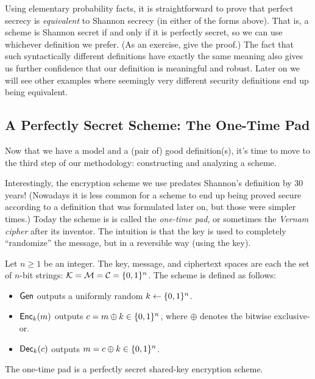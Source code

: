 \documentclass[11pt]{article}
\begin{document}
Using elementary probability facts, it is straightforward to prove
that perfect secrecy is \emph{equivalent} to Shannon secrecy (in
either of the forms above).  That is, a scheme is Shannon secret if
and only if it is perfectly secret, so we can use whichever definition
we prefer.  (As an exercise, give the proof.)  The fact that such
syntactically different definitions have exactly the same meaning also
gives us further confidence that our definition is meaningful and
robust.  Later on we will see other examples where seemingly very
different security definitions end up being equivalent.

\subsection{A Perfectly Secret Scheme: The One-Time Pad}
\label{sec:one-time-pad}

Now that we have a model and a (pair of) good definition(s), it's time
to move to the third step of our methodology: constructing and
analyzing a scheme.

Interestingly, the encryption scheme we use predates Shannon's
definition by 30 years!  (Nowadays it is less common for a scheme to
end up being proved secure according to a definition that was
formulated later on, but those were simpler times.)  Today the scheme
is is called the \emph{one-time pad}, or sometimes the \emph{Vernam
  cipher} after its inventor.  The intuition is that the key is used
to completely ``randomize'' the message, but in a reversible way
(using the key).

\begin{definition}
  Let $n \geq 1$ be an integer.  The key, message, and ciphertext
  spaces are each the set of $n$-bit strings: $\mathcal{K} = \mathcal{M} =
  \mathcal{C} = \{0,1\}^{n}$.  The scheme is defined as follows:
  \begin{itemize}
  \item $\mathsf{Gen}$ outputs a uniformly random $k \gets \{0,1\}^{n}$.
  \item $\mathsf{Enc}_{k}(m)$ outputs $c = m \oplus k \in \{0,1\}^{n}$, where
    $\oplus$ denotes the bitwise exclusive-or.
  \item $\mathsf{Dec}_{k}(c)$ outputs $m = c \oplus k \in \{0,1\}^{n}$.
  \end{itemize}
\end{definition}

\begin{theorem}
  \label{thm:otp-perfect}
  The one-time pad is a perfectly secret shared-key encryption scheme.
\end{theorem}
\end{document}
